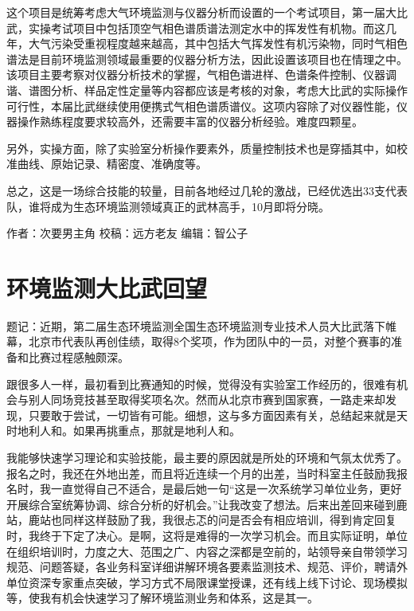 \documentclass[]{book}
\begin{document}
这个项目是统筹考虑大气环境监测与仪器分析而设置的一个考试项目，第一届大比武，实操考试项目中包括顶空气相色谱质谱法测定水中的挥发性有机物。而这几年，大气污染受重视程度越来越高，其中包括大气挥发性有机污染物，同时气相色谱法是目前环境监测领域最重要的仪器分析方法，因此设置该项目也在情理之中。该项目主要考察对仪器分析技术的掌握，气相色谱进样、色谱条件控制、仪器调谐、谱图分析、样品定性定量等内容都应该是考核的对象，考虑大比武的实际操作可行性，本届比武继续使用便携式气相色谱质谱仪。这项内容除了对仪器性能，仪器操作熟练程度要求较高外，还需要丰富的仪器分析经验。难度四颗星。

另外，实操方面，除了实验室分析操作要素外，质量控制技术也是穿插其中，如校准曲线、原始记录、精密度、准确度等。

总之，这是一场综合技能的较量，目前各地经过几轮的激战，已经优选出33支代表队，谁将成为生态环境监测领域真正的武林高手，10月即将分晓。

作者：次要男主角
校稿：远方老友
编辑：智公子

\hypertarget{ux73afux5883ux76d1ux6d4bux5927ux6bd4ux6b66ux56deux671b}{%
\section{环境监测大比武回望}\label{ux73afux5883ux76d1ux6d4bux5927ux6bd4ux6b66ux56deux671b}}

题记：近期，第二届生态环境监测全国生态环境监测专业技术人员大比武落下帷幕，北京市代表队再创佳绩，取得8个奖项，作为团队中的一员，对整个赛事的准备和比赛过程感触颇深。

跟很多人一样，最初看到比赛通知的时候，觉得没有实验室工作经历的，很难有机会与别人同场竞技甚至取得奖项名次。然而从北京市赛到国家赛，一路走来却发现，只要敢于尝试，一切皆有可能。细想，这与多方面因素有关，总结起来就是天时地利人和。如果再挑重点，那就是地利人和。

我能够快速学习理论和实验技能，最主要的原因就是所处的环境和气氛太优秀了。报名之时，我还在外地出差，而且将近连续一个月的出差，当时科室主任鼓励我报名时，我一直觉得自己不适合，是最后她一句``这是一次系统学习单位业务，更好开展综合室统筹协调、综合分析的好机会。''让我改变了想法。后来出差回来碰到鹿站，鹿站也同样这样鼓励了我，我很忐忑的问是否会有相应培训，得到肯定回复时，我终于下定了决心。是啊，这将是难得的一次学习机会。而且实际证明，单位在组织培训时，力度之大、范围之广、内容之深都是空前的，站领导亲自带领学习规范、问题答疑，各业务科室详细讲解环境各要素监测技术、规范、评价，聘请外单位资深专家重点突破，学习方式不局限课堂授课，还有线上线下讨论、现场模拟等，使我有机会快速学习了解环境监测业务和体系，这是其一。
\end{document}
